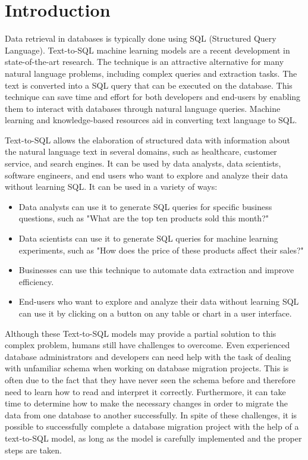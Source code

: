 \section{Introduction}

Data retrieval in databases is typically done using SQL (Structured Query Language). Text-to-SQL machine learning models are a recent development in state-of-the-art research. The technique is an attractive alternative for many natural language problems, including complex queries and extraction tasks. The text is converted into a SQL query that can be executed on the database. This technique can save time and effort for both developers and end-users by enabling them to interact with databases through natural language queries. Machine learning and knowledge-based resources aid in converting text language to SQL.

Text-to-SQL allows the elaboration of structured data with information about the natural language text in several domains, such as healthcare, customer service, and search engines. It can be used by data analysts, data scientists, software engineers, and end users who want to explore and analyze their data without learning SQL. It can be used in a variety of ways:

\begin{itemize}
      \item Data analysts can use it to generate SQL queries for specific business questions, such as "What are the top ten products sold this month?"
      \item Data scientists can use it to generate SQL queries for machine learning experiments, such as "How does the price of these products affect their sales?"
      \item Businesses can use this technique to automate data extraction and improve efficiency.
      \item End-users who want to explore and analyze their data without learning SQL can use it by clicking on a button on any table or chart in a user interface.
\end{itemize}

Although these Text-to-SQL models may provide a partial solution to this complex problem, humans still have challenges to overcome. Even experienced database administrators and developers can need help with the task of dealing with unfamiliar schema when working on database migration projects. This is often due to the fact that they have never seen the schema before and therefore need to learn how to read and interpret it correctly. Furthermore, it can take time to determine how to make the necessary changes in order to migrate the data from one database to another successfully. In spite of these challenges, it is possible to successfully complete a database migration project with the help of a text-to-SQL model, as long as the model is carefully implemented and the proper steps are taken.

